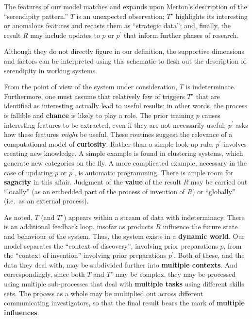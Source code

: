 The features of our model matches and expands upon Merton's \citeyear{merton1948bearing} description of the ``serendipity pattern.'' $T$ is an unexpected observation; $T^\star$ highlights its interesting or anomalous features and recasts them as ``strategic data''; and, finally, the result $R$ may include updates to $p$ or $p^{\prime}$ that inform further phases of research.  

Although they do not directly figure in our definition, the supportive
dimensions and factors can be interpreted using this schematic to
flesh out the description of serendipity in working systems.

From the point of view of the system under consideration, $T$ is
indeterminate.  Furthermore, one must assume that relatively few of
triggers $T^\star$ that are identified as interesting actually lead to
useful results; in other words, the process is fallible and
\textbf{chance} is likely to play a role.
%
The prior training $p$ causes interesting features
to be extracted, even if they are not necessarily useful; $p^{\prime}$
asks how these features \emph{might} be useful.  These routines 
suggest the relevance of a computational model of \textbf{curiosity}.
%
Rather than a simple look-up rule, $p^{\prime}$ involves creating new knowledge.  A simple example is found in clustering systems, which generate new categories on the fly.  A more complicated example, necessary in the case of updating $p$ or $p^{\prime}$, is automatic programming.  There is ample room for \textbf{sagacity} in this affair.
%
Judgment of the \textbf{value} of the result $R$ may be carried out
``locally'' (as an embedded part of the process of invention of $R$)
or ``globally'' (i.e.~as an external process).

As noted, $T$ (and $T^\star$) appears within a stream of data with
indeterminacy.  There is an additional feedback loop, insofar as
products $R$ influence the future state and behaviour of the system.
Thus, the system exists in a \textbf{dynamic world}.
%
Our model separates the
``context of discovery'', involving prior preparations $p$, from the
``context of invention'' involving prior preparations $p^{\prime}$.
Both of these, and the data they deal with, may be subdivided further into \textbf{multiple contexts}. 
%
And correspondingly, since both $T$ and $T^\star$ may be complex, they
may be processed using multiple sub-processes that deal with
\textbf{multiple tasks} using different skills sets.
%
The process as a whole may be multiplied out across different
communicating investigators, so that the final result bears the mark
of \textbf{multiple influences}.





